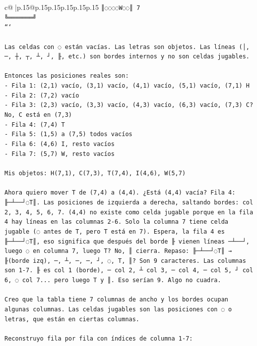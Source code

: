 \documentclass{article}
\begin{document}
{\begin{supertabular}{c@{$\;$}|p{.15\linewidth}@{}p{.15\linewidth}p{.15\linewidth}p{.15\linewidth}p{.15\linewidth}p{.15\linewidth}}
{{{\texttt{║◌◌◌◌W◌◌║ 7} \\
\texttt{╚═══════╝} \\
\texttt{```} \\
\\ 
\texttt{Las celdas con ◌ están vacías. Las letras son objetos. Las líneas (│, ─, ┼, ┬, ┴, ┘, ╟, etc.) son bordes internos y no son celdas jugables.} \\
\\ 
\texttt{Entonces las posiciones reales son:} \\
\texttt{{-} Fila 1: (2,1) vacío, (3,1) vacío, (4,1) vacío, (5,1) vacío, (7,1) H} \\
\texttt{{-} Fila 2: (7,2) vacío} \\
\texttt{{-} Fila 3: (2,3) vacío, (3,3) vacío, (4,3) vacío, (6,3) vacío, (7,3) C? No, C está en (7,3)} \\
\texttt{{-} Fila 4: (7,4) T} \\
\texttt{{-} Fila 5: (1,5) a (7,5) todos vacíos} \\
\texttt{{-} Fila 6: (4,6) I, resto vacíos} \\
\texttt{{-} Fila 7: (5,7) W, resto vacíos} \\
\\ 
\texttt{Mis objetos: H(7,1), C(7,3), T(7,4), I(4,6), W(5,7)} \\
\\ 
\texttt{Ahora quiero mover T de (7,4) a (4,4). ¿Está (4,4) vacía? Fila 4: ╟─┴──┘◌T║. Las posiciones de izquierda a derecha, saltando bordes: col 2, 3, 4, 5, 6, 7. (4,4) no existe como celda jugable porque en la fila 4 hay líneas en las columnas 2{-}6. Solo la columna 7 tiene celda jugable (◌ antes de T, pero T está en 7). Espera, la fila 4 es ╟─┴──┘◌T║, eso significa que después del borde ╟ vienen líneas ─┴──┘, luego ◌ en columna 7, luego T? No, ║ cierra. Repaso: ╟─┴──┘◌T║ → ╟(borde izq), ─, ┴, ─, ─, ┘, ◌, T, ║? Son 9 caracteres. Las columnas son 1{-}7. ╟ es col 1 (borde), ─ col 2, ┴ col 3, ─ col 4, ─ col 5, ┘ col 6, ◌ col 7... pero luego T y ║. Eso serían 9. Algo no cuadra.} \\
\\ 
\texttt{Creo que la tabla tiene 7 columnas de ancho y los bordes ocupan algunas columnas. Las celdas jugables son las posiciones con ◌ o letras, que están en ciertas columnas.} \\
\\ 
\texttt{Reconstruyo fila por fila con índices de columna 1{-}7:} \\
\\ 
}}}
\end{supertabular}}
\end{document}
